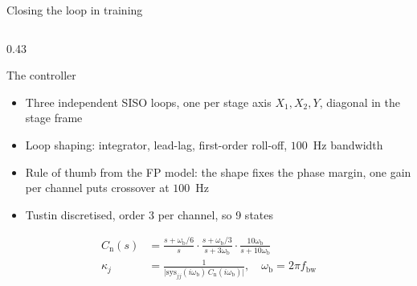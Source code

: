 \documentclass[aspectratio=169,11pt]{beamer}
\newcommand{\Cnorm}{C_{\mathrm{n}}}
\newcommand{\wb}{\omega_{\mathrm{b}}}
\begin{document}
\begin{frame}{Closing the loop in training}

\begin{columns}[T,onlytextwidth]

\begin{column}{0.43\textwidth}
\begin{block}{The controller}
\scriptsize
\begin{itemize}\setlength\itemsep{0.2em}
  \item Three independent SISO loops, one per stage axis $X_1, X_2, Y$, diagonal in the stage
        frame
  \item Loop shaping: integrator, lead-lag, first-order roll-off, $100$~Hz bandwidth
  \item Rule of thumb from the FP model: the shape fixes the phase margin, one gain per channel
        puts crossover at $100$~Hz
  \vspace{-0.2em}
  \item Tustin discretised, order 3 per channel, so 9 states
\end{itemize}
\vspace{0.2em}
{\scriptsize
\begin{align*}
  \Cnorm(s) &= \frac{s+\wb/6}{s}\cdot\frac{s+\wb/3}{s+3\wb}\cdot\frac{10\wb}{s+10\wb} \\[-0.2em]
  \kappa_j  &= \frac{1}{\bigl|\mathrm{sys}_{jj}(i\wb)\,\Cnorm(i\wb)\bigr|},
               \quad \wb = 2\pi f_{\mathrm{bw}}
\end{align*}}
\vspace{-1.2em}
\end{block}
\end{column}


\end{columns}
\end{frame}
\end{document}
